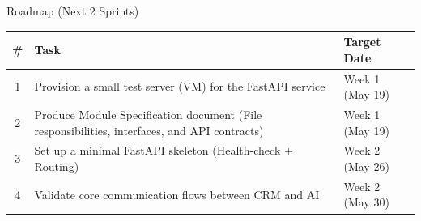 \begin{frame}{Roadmap (Next 2 Sprints)}
 

    \vspace{0.3cm}
    \begin{table}[]
        \centering
        \renewcommand{\arraystretch}{1.5} %
        \begin{tabular}{|c|p{7.5cm}|l|}
            \hline
            \textbf{\#} & \textbf{Task} & \textbf{Target Date} \\ \hline
            1 & Provision a small test server (VM) for the FastAPI service & Week 1 (May 19) \\ \hline
            2 & Produce Module Specification document (File responsibilities, interfaces, and API contracts) & Week 1 (May 19) \\ \hline
            3 & Set up a minimal FastAPI skeleton (Health-check + Routing) & Week 2 (May 26) \\ \hline
            4 & Validate core communication flows between CRM and AI & Week 2 (May 30) \\ \hline
        \end{tabular}
    \end{table}

    
\end{frame}